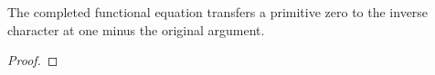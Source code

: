 \begin{theorem}
\label{reflect}
\leanok
The completed functional equation transfers a primitive zero to the inverse character at one minus the original argument.
\end{theorem}
\begin{proof}
\leanok
\end{proof}
